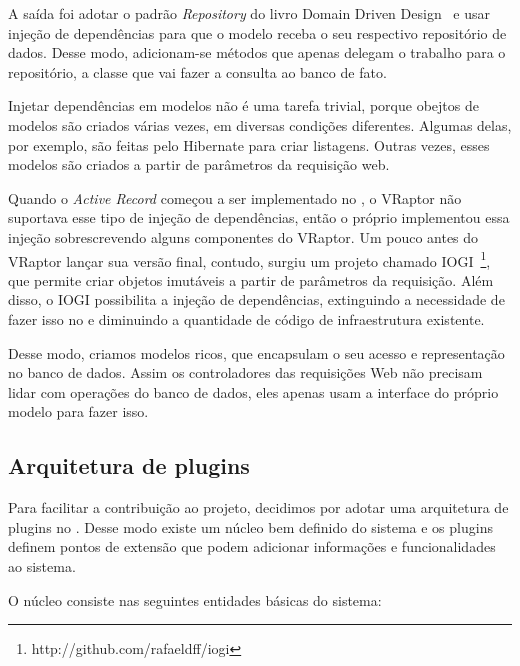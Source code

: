 A saída foi adotar o padrão \textit{Repository} do livro Domain Driven Design~\cite{ddd} e usar injeção de dependências para que o modelo receba o seu respectivo repositório de dados. Desse modo, adicionam-se métodos que apenas delegam o trabalho para o repositório, a classe que vai fazer a consulta ao banco de fato.

Injetar dependências em modelos não é uma tarefa trivial, porque obejtos de modelos são criados várias vezes, em diversas condições diferentes. Algumas delas, por exemplo, são feitas pelo Hibernate para criar listagens. Outras vezes, esses modelos são criados a partir de parâmetros da requisição web. 

Quando o \textit{Active Record} começou a ser implementado no \calopsita{}, o VRaptor não suportava esse tipo de injeção de dependências, então o próprio \calopsita{} implementou essa injeção sobrescrevendo alguns componentes do VRaptor. Um pouco antes do VRaptor lançar sua versão final, contudo, surgiu um projeto \opensource{} chamado IOGI~\footnote{http://github.com/rafaeldff/iogi}, que permite criar objetos imutáveis a partir de parâmetros da requisição. Além disso, o IOGI possibilita a injeção de dependências, extinguindo a necessidade de fazer isso no \calopsita{} e diminuindo a quantidade de código de infraestrutura existente.

Desse modo, criamos modelos ricos, que encapsulam o seu acesso e representação no banco de dados. Assim os controladores das requisições Web não precisam lidar com operações do banco de dados, eles apenas usam a interface do próprio modelo para fazer isso.

\subsection{Arquitetura de plugins}

Para facilitar a contribuição ao projeto, decidimos por adotar uma arquitetura de plugins no \calopsita{}. Desse modo existe um núcleo bem definido do sistema e os plugins definem pontos de extensão que podem adicionar informações e funcionalidades ao sistema.

O núcleo consiste nas seguintes entidades básicas do sistema:


